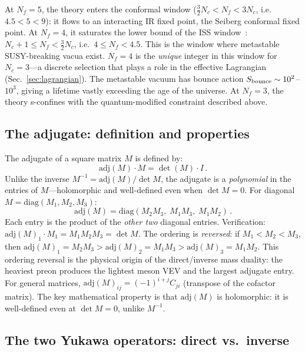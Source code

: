 \documentclass[aps,prd,twocolumn,showpacs,preprintnumbers,superscriptaddress,floatfix]{revtex4-2}
\newcommand{\Nf}{N_{\!f}}
\newcommand{\Nc}{N_{\!c}}
\newcommand{\adj}{\mathrm{adj}}
\newcommand{\diag}{\mathrm{diag}}
\begin{document}
At $\Nf = 5$, the theory enters the conformal window
($\frac{3}{2}\Nc < \Nf < 3\Nc$, i.e.\ $4.5 < 5 < 9$): it flows
to an interacting IR fixed point, the Seiberg conformal fixed
point.
At $\Nf = 4$, it saturates the lower bound of the ISS
window~\cite{ISS:2006}: $\Nc {+} 1 \leq \Nf < \frac{3}{2}\Nc$,
i.e.\ $4 \leq \Nf < 4.5$.
This is the window where metastable SUSY-breaking vacua exist.
$\Nf = 4$ is the \emph{unique} integer in this window for
$\Nc = 3$---a discrete selection that plays a role in the
effective Lagrangian (Sec.~\ref{sec:lagrangian}).
The metastable vacuum has bounce action
$S_{\rm bounce} \sim 10^2$--$10^3$, giving a lifetime vastly
exceeding the age of the universe.
At $\Nf = 3$, the theory s-confines with the quantum-modified
constraint described above.


\subsection{The adjugate: definition and properties}

The adjugate of a square matrix $M$ is defined by:
\begin{equation}
  \adj(M) \cdot M = \det(M) \cdot I\,.
  \label{eq:adj_def}
\end{equation}
Unlike the inverse $M^{-1} = \adj(M)/\det M$, the adjugate
is a \emph{polynomial} in the entries of $M$---holomorphic and
well-defined even when $\det M = 0$.
For diagonal $M = \diag(M_1, M_2, M_3)$:
\begin{equation}
  \adj(M) = \diag(M_2 M_3,\; M_1 M_3,\; M_1 M_2)\,.
  \label{eq:adj_3x3}
\end{equation}
Each entry is the product of the \emph{other two} diagonal
entries.
Verification: $\adj(M)_1 \cdot M_1 = M_1 M_2 M_3 = \det M$.
The ordering is \emph{reversed}: if
$M_1 < M_2 < M_3$, then
$\adj(M)_1 = M_2 M_3 > \adj(M)_2 = M_1 M_3 > \adj(M)_3 =
M_1 M_2$.
This ordering reversal is the physical origin of the
direct/inverse mass duality: the heaviest preon produces the
lightest meson VEV and the largest adjugate entry.
For general matrices, $\adj(M)_{ij} = (-1)^{i+j} C_{ji}$
(transpose of the cofactor matrix).
The key mathematical property is that $\adj(M)$ is holomorphic:
it is well-defined even at $\det M = 0$, unlike $M^{-1}$.


\subsection{The two Yukawa operators: direct vs.\ inverse}
\end{document}
